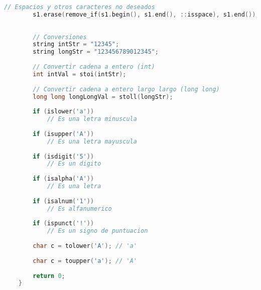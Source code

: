 \begin{lstlisting}[language=C++]
		// Espacios y otros caracteres no deseados
		s1.erase(remove_if(s1.begin(), s1.end(), ::isspace), s1.end()); // Eliminar espacios
		
		
		// Conversiones
		string intStr = "12345";
		string longStr = "123456789012345";
		
		// Convertir cadena a entero (int)
		int intVal = stoi(intStr);
		
		// Convertir cadena a entero largo largo (long long)
		long long longLongVal = stoll(longStr);
		
		if (islower('a')) 
			// Es una letra minuscula
		
		if (isupper('A')) 
			// Es una letra mayuscula
		
		if (isdigit('5')) 
			// Es un digito
			
		if (isalpha('A')) 
			// Es una letra
			
		if (isalnum('1')) 
			// Es alfanumerico
			
		if (ispunct('!')) 
			// Es un signo de puntuacion
			
		char c = tolower('A'); // 'a'
		
		char c = toupper('a'); // 'A'
		
		return 0;
	}
\end{lstlisting}
